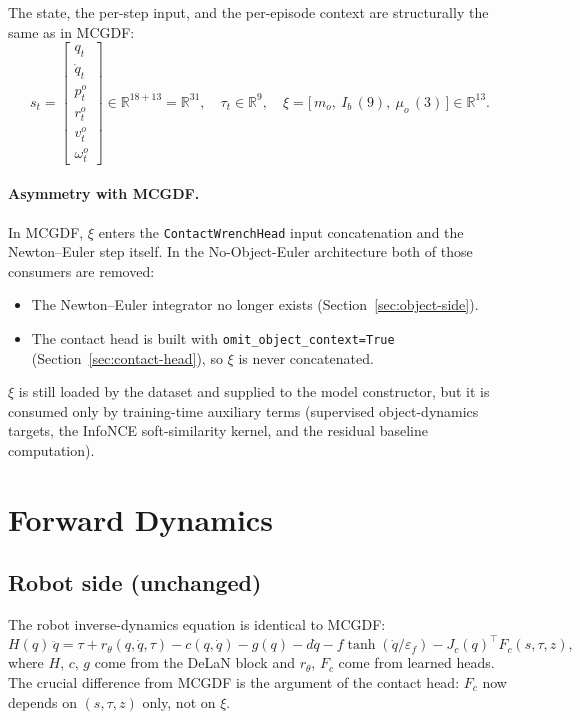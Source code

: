\documentclass[11pt]{article}
\begin{document}
The state, the per-step input, and the per-episode context are
structurally the same as in MCGDF:
\begin{equation}
  s_t =
  \begin{bmatrix}
    q_t \\ \dot q_t \\ p^o_t \\ r^o_t \\ v^o_t \\ \omega^o_t
  \end{bmatrix} \in \mathbb{R}^{18 + 13} = \mathbb{R}^{31},
  \quad
  \tau_t \in \mathbb{R}^9,
  \quad
  \xi = \bigl[\,m_o,\ I_b\,\mathrm{(9)},\ \mu_o\,(3)\,\bigr] \in \mathbb{R}^{13}.
\end{equation}
\paragraph{Asymmetry with MCGDF.}  In MCGDF, $\xi$ enters the
\texttt{ContactWrenchHead} input concatenation and the Newton--Euler
step itself.  In the No-Object-Euler architecture both of those
consumers are removed:
\begin{itemize}
  \item The Newton--Euler integrator no longer exists
    (Section~\ref{sec:object-side}).
  \item The contact head is built with \texttt{omit\_object\_context=True}
    (Section~\ref{sec:contact-head}), so $\xi$ is never concatenated.
\end{itemize}
$\xi$ is still loaded by the dataset and supplied to the model
constructor, but it is consumed only by training-time auxiliary terms
(supervised object-dynamics targets, the InfoNCE soft-similarity
kernel, and the residual baseline computation).

\section{Forward Dynamics}

\subsection{Robot side (unchanged)}

The robot inverse-dynamics equation is identical to MCGDF:
\begin{equation}
  H(q)\,\ddot q
  = \tau + r_\theta(q,\dot q,\tau)
  - c(q,\dot q) - g(q)
  - d\dot q - f\tanh(\dot q/\varepsilon_f)
  - J_c(q)^\top F_c(s,\tau,z),
  \label{eq:noe-robot}
\end{equation}
where $H$, $c$, $g$ come from the DeLaN block and $r_\theta$, $F_c$
come from learned heads.  The crucial difference from MCGDF is the
argument of the contact head: $F_c$ now depends on $(s,\tau,z)$ only,
not on $\xi$.
\end{document}
